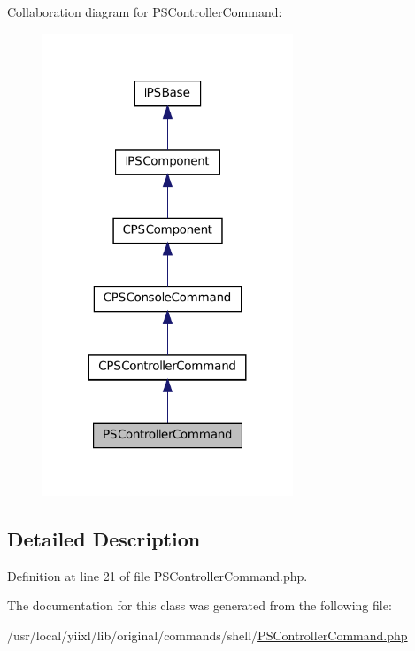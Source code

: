 Collaboration diagram for PSControllerCommand:\nopagebreak
\begin{figure}[H]
\begin{center}
\leavevmode
\includegraphics[width=212pt]{classPSControllerCommand__coll__graph}
\end{center}
\end{figure}


\subsection{Detailed Description}


Definition at line 21 of file PSControllerCommand.php.



The documentation for this class was generated from the following file:\begin{DoxyCompactItemize}
\item 
/usr/local/yiixl/lib/original/commands/shell/\hyperlink{PSControllerCommand_8php}{PSControllerCommand.php}\end{DoxyCompactItemize}
